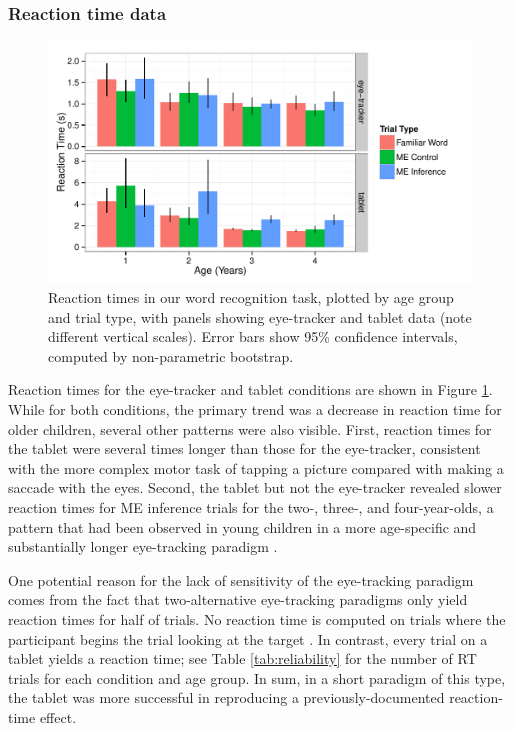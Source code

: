 \documentclass[man,noapacite]{apa2}
\begin{document}
\subsubsection{Reaction time data}

\begin{figure}[t] 
  \begin{center} 
    \includegraphics[width=5in]{figures/rt.pdf} 
    \caption{\label{fig:rt} Reaction times in our word recognition task, plotted by age group and trial type, with panels showing eye-tracker and tablet data (note different vertical scales). Error bars show 95\% confidence intervals, computed by non-parametric bootstrap.}
  \end{center} 
\end{figure}

Reaction times for the eye-tracker and tablet conditions are shown in Figure \ref{fig:rt}. While for both conditions, the primary trend was a decrease in reaction time for older children, several other patterns were also visible. First, reaction times for the tablet were several times longer than those for the eye-tracker, consistent with the more complex motor task of tapping a picture compared with making a saccade with the eyes. Second, the tablet but not the eye-tracker revealed slower reaction times for ME inference trials for the two-, three-, and four-year-olds, a pattern that had been observed in young children in a more age-specific and substantially longer eye-tracking paradigm \cite{bion2013}. 

One potential reason for the lack of sensitivity of the eye-tracking paradigm comes from the fact that two-alternative eye-tracking paradigms only yield reaction times for half of trials. No reaction time is computed on trials where the participant begins the trial looking at the target \cite{fernald2008}. In contrast, every trial on a tablet yields a reaction time; see Table \ref{tab:reliability} for the number of RT trials for each condition and age group. In sum, in a short paradigm of this type, the tablet was more successful in reproducing a previously-documented reaction-time effect.
\end{document}
